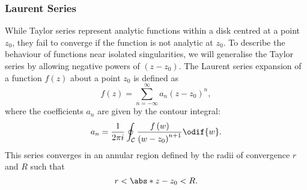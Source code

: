 \documentclass{article}
\begin{document}
\subsubsection{Laurent Series}
While Taylor series represent analytic functions within a disk centred
at a point \(z_0\), they fail to converge if the function is not
analytic at \(z_0\). To describe the behaviour of functions near
isolated singularities, we will generalise the Taylor series by allowing
negative powers of \(\left( z - z_0 \right)\).
The Laurent series expansion of a function \(f\left( z \right)\) about a
point \(z_0\) is defined as
\begin{equation*}
    f\left( z \right) = \sum_{n = -\infty}^\infty a_n \left( z - z_0 \right)^n,
\end{equation*}
where the coefficients \(a_n\) are given by the contour integral:
\begin{equation*}
    a_n = \frac{1}{2 \pi i} \oint_{\mathcal{C}} \frac{f\left( w \right)}{\left( w - z_0 \right)^{n + 1}} \odif{w}.
\end{equation*}
This series converges in an annular region defined by the radii of
convergence \(r\) and \(R\) such that
\begin{equation*}
    r < \abs*{z - z_0} < R.
\end{equation*}
\end{document}
